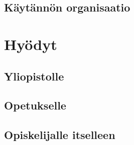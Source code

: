 \documentclass[finnish]{tktltiki2}
\theoremstyle{definition}
\theoremstyle{remark}
\begin{document}


\subsection{Käytännön organisaatio}







\section{Hyödyt}

\subsection{Yliopistolle}

\subsection{Opetukselle}

\subsection{Opiskelijalle itselleen}



\end{document}
